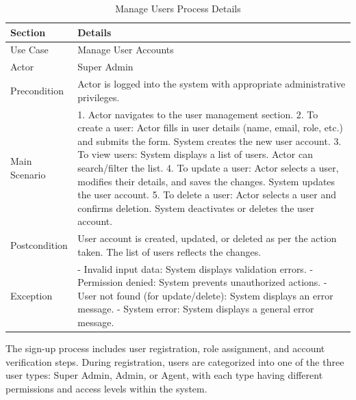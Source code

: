 \begin{table}[htbp]
    \centering
    \begin{tabular}{|l|p{}|}
        \hline
        \textbf{Section} & \textbf{Details} \\
        \hline
        Use Case & Manage User Accounts \\
        \hline
        Actor & Super Admin \\
        \hline
        Precondition & Actor is logged into the system with appropriate administrative privileges. \\
        \hline
        Main Scenario & 
        1. Actor navigates to the user management section.
        2. To create a user: Actor fills in user details (name, email, role, etc.) and submits the form. System creates the new user account.
        3. To view users: System displays a list of users. Actor can search/filter the list.
        4. To update a user: Actor selects a user, modifies their details, and saves the changes. System updates the user account.
        5. To delete a user: Actor selects a user and confirms deletion. System deactivates or deletes the user account. \\
        \hline
        Postcondition & User account is created, updated, or deleted as per the action taken. The list of users reflects the changes. \\
        \hline
        Exception & 
        - Invalid input data: System displays validation errors.
        - Permission denied: System prevents unauthorized actions.
        - User not found (for update/delete): System displays an error message.
        - System error: System displays a general error message. \\
        \hline
    \end{tabular}
    \caption{Manage Users Process Details}
    \label{tab:manage_users_process}
\end{table}


The sign-up process includes user registration, role assignment, and account verification steps. During registration, users are categorized into one of the three user types: Super Admin, Admin, or Agent, with each type having different permissions and access levels within the system.

\newpage    

